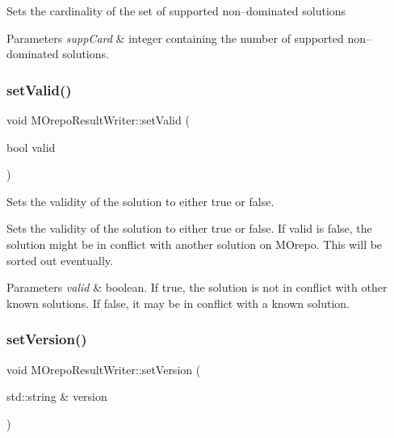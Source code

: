 Sets the cardinality of the set of supported non--dominated solutions 
\begin{DoxyParams}{Parameters}
{\em supp\+Card} & integer containing the number of supported non--dominated solutions. \\
\hline
\end{DoxyParams}
\mbox{\label{class_m_orepo_result_writer_aaf7016f6cb3b0f2712c09a8394d0f91a}} 
\subsubsection{\texorpdfstring{set\+Valid()}{setValid()}}
{\footnotesize\ttfamily void M\+Orepo\+Result\+Writer\+::set\+Valid (\begin{DoxyParamCaption}\item[{bool}]{valid }\end{DoxyParamCaption})\hspace{0.3cm}{\ttfamily [inline]}}



Sets the validity of the solution to either true or false. 

Sets the validity of the solution to either true or false. If valid is false, the solution might be in conflict with another solution on M\+Orepo. This will be sorted out eventually. 
\begin{DoxyParams}{Parameters}
{\em valid} & boolean. If true, the solution is not in conflict with other known solutions. If false, it may be in conflict with a known solution. \\
\hline
\end{DoxyParams}
\mbox{\label{class_m_orepo_result_writer_a592ba40e1ff29b5734056a06b99a5c83}} 
\subsubsection{\texorpdfstring{set\+Version()}{setVersion()}}
{\footnotesize\ttfamily void M\+Orepo\+Result\+Writer\+::set\+Version (\begin{DoxyParamCaption}\item[{std\+::string \&}]{version }\end{DoxyParamCaption})\hspace{0.3cm}{\ttfamily [inline]}}



